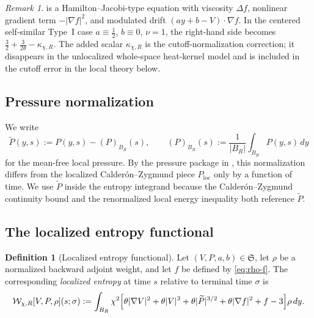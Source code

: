 \documentclass[11pt]{amsart}
\numberwithin{equation}{section}
\theoremstyle{plain}
\theoremstyle{definition}
\newtheorem{definition}[theorem]{Definition}
\theoremstyle{remark}
\newtheorem{remark}[theorem]{Remark}
\newcommand{\Wloc}{\mathcal W}
\newcommand{\State}{\mathfrak S}
\newcommand{\Ploc}{P_{\mathrm{loc}}}
\newcommand{\kappachi}{\kappa_{\chi,R}}
\begin{document}
\begin{remark}\label{rem:f-equation-shape}
 is a Hamilton--Jacobi-type equation with viscosity
\(\Delta f\), nonlinear gradient term \(-|\nabla f|^2\), and modulated drift
\((a y+b-V)\cdot\nabla f\).  In the centered self-similar Type~I case
\(a\equiv\tfrac12\), \(b\equiv0\), \(\nu=1\), the right-hand side becomes
\(\tfrac32+\tfrac{3}{2\theta}-\kappachi\).  The added scalar
\(\kappachi\) is the cutoff-normalization correction; it disappears in the
unlocalized whole-space heat-kernel model and is included in the cutoff error
in the local theory below.
\end{remark}

\subsection{Pressure normalization}

We write
\begin{equation}\label{eq:pressure-tilde}
	\widetilde P(y,s):=P(y,s)-(P)_{B_R}(s),
	\qquad (P)_{B_R}(s):=\frac{1}{|B_R|}\int_{B_R}P(y,s)\,dy
\end{equation}
for the mean-free local pressure.  By the pressure package in
, this normalization differs from the
localized Calder\'on--Zygmund piece \(\Ploc\) only by a function of time.  We
use \(\widetilde P\) inside the entropy integrand because the
Calder\'on--Zygmund continuity bound and the renormalized local energy
inequality both reference \(\widetilde P\).

\subsection{The localized entropy functional}

\begin{definition}[Localized entropy functional]
\label{def:entropy}
Let \((V,P,a,b)\in\State\), let \(\rho\) be a normalized backward adjoint
weight, and let \(f\) be defined by \eqref{eq:rho-f}.  The corresponding
\emph{localized entropy} at time \(s\) relative to terminal time \(\sigma\)
is
\begin{equation}\label{eq:entropy-def}
\begin{aligned}
	\Wloc_{\chi,R}[V,P,\rho](s;\sigma)
	:= \int_{B_R}\chi^2
	\Bigl[
			\theta |\nabla V|^2
		+ \theta |V|^3
		+ \theta |\widetilde P|^{3/2}
		+ \theta |\nabla f|^2
		+ f - 3
	\Bigr]\rho\,dy.
\end{aligned}
\end{equation}
\end{definition}
\end{document}
